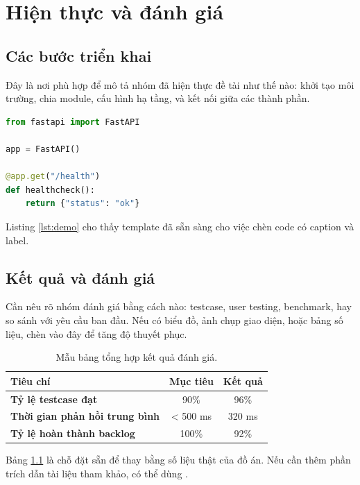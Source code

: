 \chapter{Hiện thực và đánh giá}
\label{chap:implementation}

\section{Các bước triển khai}

Đây là nơi phù hợp để mô tả nhóm đã hiện thực đề tài như thế nào: khởi tạo môi trường,
chia module, cấu hình hạ tầng, và kết nối giữa các thành phần.

\begin{lstlisting}[language=Python, caption={Ví dụ đoạn mã minh họa cách chèn code.}, label={lst:demo}]
from fastapi import FastAPI

app = FastAPI()

@app.get("/health")
def healthcheck():
    return {"status": "ok"}
\end{lstlisting}

Listing \ref{lst:demo} cho thấy template đã sẵn sàng cho việc chèn code có caption và label.

\section{Kết quả và đánh giá}

Cần nêu rõ nhóm đánh giá bằng cách nào: testcase, user testing, benchmark, hay so sánh với yêu cầu ban đầu.
Nếu có biểu đồ, ảnh chụp giao diện, hoặc bảng số liệu, chèn vào đây để tăng độ thuyết phục.

\begin{table}[H]
  \centering
  \begin{tabular}{|>{\bfseries}l|c|c|}
    \hline
    Tiêu chí & Mục tiêu & Kết quả \\
    \hline
    Tỷ lệ testcase đạt & 90\% & 96\% \\
    \hline
    Thời gian phản hồi trung bình & < 500 ms & 320 ms \\
    \hline
    Tỷ lệ hoàn thành backlog & 100\% & 92\% \\
    \hline
  \end{tabular}
  \caption{Mẫu bảng tổng hợp kết quả đánh giá.}
  \label{tab:evaluation}
\end{table}

Bảng \ref{tab:evaluation} là chỗ đặt sẵn để thay bằng số liệu thật của đồ án.
Nếu cần thêm phần trích dẫn tài liệu tham khảo, có thể dùng \cite{mittelbach2004latexcompanion}.

